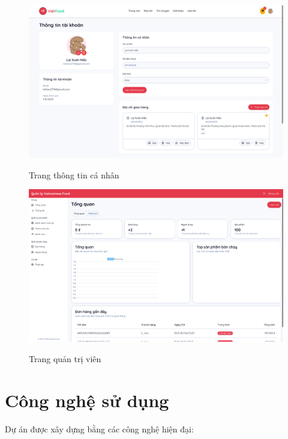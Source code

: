 \begin{figure}[H]
    \centering
    \begin{minipage}{0.48\textwidth}
        \centering
        \includegraphics[width=\textwidth]{images/profile-page.png}
        \caption{Trang thông tin cá nhân}
        \label{fig:profile}
    \end{minipage}
    \hfill
    \begin{minipage}{0.48\textwidth}
        \centering
        \includegraphics[width=\textwidth]{images/admin-page.png}
        {\footnotesize \caption{Trang quản trị viên}}
        \label{fig:admin}
    \end{minipage}
\end{figure}

\section{Công nghệ sử dụng}
Dự án được xây dựng bằng các công nghệ hiện đại:

